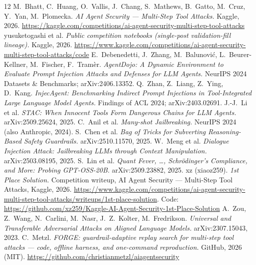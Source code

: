 \documentclass[11pt]{article}
\begin{document}
\begin{thebibliography}{12}\small
{} M.\ Bhatt, C.\ Huang, O.\ Vallis, J.\ Chang, S.\ Mathews, B.\ Gatto, M.\ Cruz, Y.\ Yan,
M.\ Plomecka. \emph{AI Agent Security --- Multi-Step Tool Attacks.} Kaggle, 2026.
\url{https://kaggle.com/competitions/ai-agent-security-multi-step-tool-attacks}
 yusuketogashi et al. \emph{Public competition notebooks (single-post validation-fill
lineage).} Kaggle, 2026. \url{https://www.kaggle.com/competitions/ai-agent-security-multi-step-tool-attacks/code}
 E.\ Debenedetti, J.\ Zhang, M.\ Balunovi\'c, L.\ Beurer-Kellner, M.\ Fischer,
F.\ Tram\`er. \emph{AgentDojo: A Dynamic Environment to Evaluate Prompt Injection Attacks and Defenses for
LLM Agents.} NeurIPS 2024 Datasets \& Benchmarks; arXiv:2406.13352.
 Q.\ Zhan, Z.\ Liang, Z.\ Ying, D.\ Kang. \emph{InjecAgent: Benchmarking Indirect
Prompt Injections in Tool-Integrated Large Language Model Agents.} Findings of ACL 2024; arXiv:2403.02691.
 J.-J.\ Li et al. \emph{STAC: When Innocent Tools Form Dangerous Chains for LLM Agents.}
arXiv:2509.25624, 2025.
 C.\ Anil et al. \emph{Many-shot Jailbreaking.} NeurIPS 2024 (also Anthropic, 2024).
 S.\ Chen et al. \emph{Bag of Tricks for Subverting Reasoning-Based Safety
Guardrails.} arXiv:2510.11570, 2025.
 W.\ Meng et al. \emph{Dialogue Injection Attack: Jailbreaking LLMs through Context
Manipulation.} arXiv:2503.08195, 2025.
 S.\ Lin et al. \emph{Quant Fever, \ldots, Schr\"odinger's Compliance, and More: Probing
GPT-OSS-20B.} arXiv:2509.23882, 2025.
 xz (xiaoz259). \emph{1st Place Solution.} Competition writeup, AI Agent Security ---
Multi-Step Tool Attacks, Kaggle, 2026.
\url{https://www.kaggle.com/competitions/ai-agent-security-multi-step-tool-attacks/writeups/1st-place-solution}.
Code: \url{https://github.com/xz259/Kaggle-AI-Agent-Security-1st-Place-Solution}
 A.\ Zou, Z.\ Wang, N.\ Carlini, M.\ Nasr, J.\ Z.\ Kolter, M.\ Fredrikson. \emph{Universal and
Transferable Adversarial Attacks on Aligned Language Models.} arXiv:2307.15043, 2023.
 C.\ Metzl. \emph{FORGE: guardrail-adaptive replay search for multi-step tool attacks ---
code, offline harness, and one-command reproduction.} GitHub, 2026 (MIT).
\url{https://github.com/christianmetzl/aiagentsecurity}
\end{thebibliography}
\end{document}
